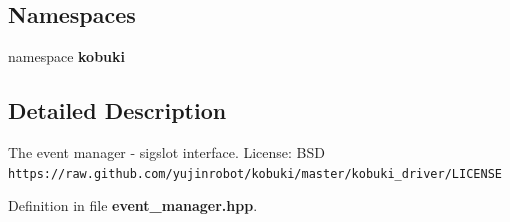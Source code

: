 \subsection*{\-Namespaces}
\begin{DoxyCompactItemize}
\item 
namespace {\bf kobuki}
\end{DoxyCompactItemize}


\subsection{\-Detailed \-Description}
\-The event manager -\/ sigslot interface. \-License\-: \-B\-S\-D {\tt https\-://raw.\-github.\-com/yujinrobot/kobuki/master/kobuki\-\_\-driver/\-L\-I\-C\-E\-N\-S\-E} 

\-Definition in file {\bf event\-\_\-manager.\-hpp}.

